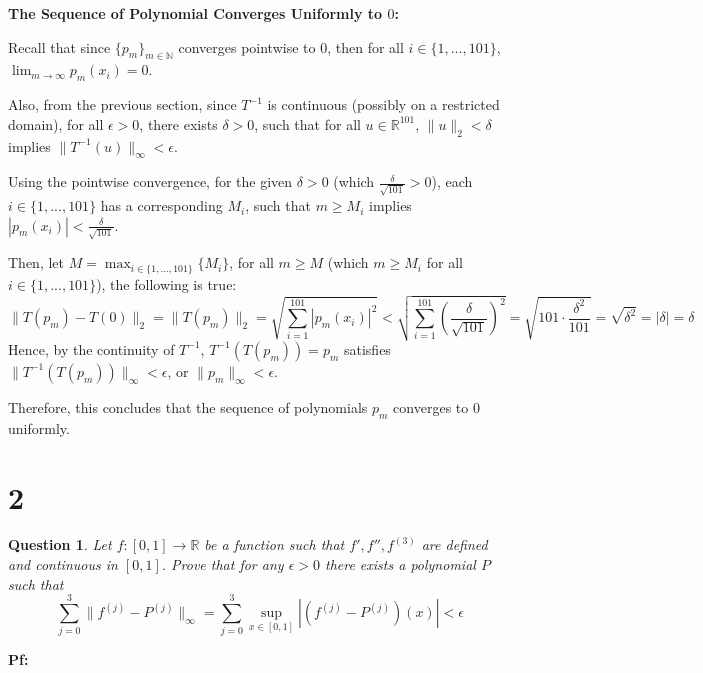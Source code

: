 \documentclass{article}
\newtheorem{question}{Question}
\begin{document}
\begin{itemize}
    \hfill

    \textbf{The Sequence of Polynomial Converges Uniformly to $0$:}

    Recall that since $\{p_m\}_{m\in\mathbb{N}}$ converges pointwise to $0$, then for all $i\in\{1,...,101\}$, $\lim_{m\rightarrow\infty}p_m(x_i)=0$.

    Also, from the previous section, since $T^{-1}$ is continuous (possibly on a restricted domain), for all $\epsilon>0$, there exists $\delta>0$, such that for all $u\in\mathbb{R}^{101}$, $\|u\|_2<\delta$ implies $\|T^{-1}(u)\|_\infty<\epsilon$.

    \hfill

    Using the pointwise convergence, for the given $\delta>0$ (which $\frac{\delta}{\sqrt{101}}>0$), each $i\in\{1,...,101\}$ has a corresponding $M_i$, such that $m\geq M_i$ implies $|p_m(x_i)|<\frac{\delta}{\sqrt{101}}$.

    Then, let $M = \max_{i\in\{1,...,101\}}\{M_i\}$, for all $m\geq M$ (which $m\geq M_i$ for all $i\in\{1,...,101\}$), the following is true:
    $$\|T(p_m)-T(0)\|_2 = \|T(p_m)\|_2 = \sqrt{\sum_{i=1}^{101}|p_m(x_i)|^2} < \sqrt{\sum_{i=1}^{101}\left(\frac{\delta}{\sqrt{101}}\right)^2} = \sqrt{101\cdot \frac{\delta^2}{101}} = \sqrt{\delta^2} = |\delta|=\delta$$
    Hence, by the continuity of $T^{-1}$, $T^{-1}(T(p_m)) = p_m$ satisfies $\|T^{-1}(T(p_m))\|_\infty < \epsilon$, or $\|p_m\|_\infty<\epsilon$.

    Therefore, this concludes that the sequence of polynomials $p_m$ converges to $0$ uniformly.
\end{itemize}

\hfill

\hfill

\section*{2}
\begin{myBox}[]{}
    \begin{question}
        Let $f:[0,1]\rightarrow\mathbb{R}$ be a function such that $f',f'',f^{(3)}$ are defined and continuous in $[0,1]$.
        Prove that for any $\epsilon>0$ there exists a polynomial $P$ such that
        $$\sum_{j=0}^{3}\|f^{(j)}-P^{(j)}\|_\infty = \sum_{j=0}^{3}\sup_{x\in[0,1]}|(f^{(j)}-P^{(j)})(x)|<\epsilon$$
    \end{question}
\end{myBox}

\textbf{Pf:}
\end{document}
